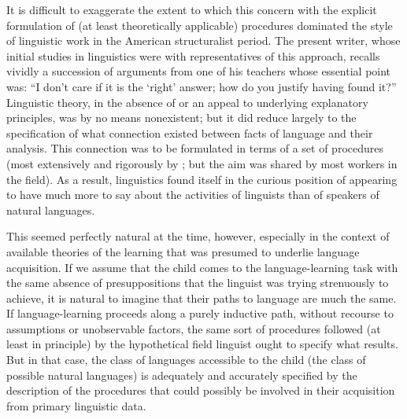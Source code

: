 It is difficult to exaggerate the extent to which this concern with
the explicit formulation of (at least theoretically applicable)
procedures dominated the style of linguistic work in the American
structuralist period. The present writer, whose initial studies in
linguistics were with representatives of this approach, recalls
vividly a succession of arguments from one of his teachers whose essential point was: ``I don't
care if it is the `right' answer; how do you justify having found it?''
Linguistic theory, in the absence of  or an appeal to
underlying explanatory principles, was by no means nonexistent; but it
did reduce largely to the specification of what connection existed
between facts of language and their analysis. This connection was to
be formulated in terms of a set of procedures (most extensively and
rigorously by \citet{harris:methods}; but the aim was shared by most
workers in the field). As a result, linguistics found itself in the
curious position of appearing to have much more to say about the
activities of linguists than of speakers of natural languages.

This seemed perfectly natural at the time, however, especially in the
context of available theories of the learning that was presumed to
underlie language acquisition. If we assume that the child comes to
the language-learning task with the same absence of presuppositions
that the linguist was trying strenuously to achieve, it is natural to
imagine that their paths to language are much the same. If
language-learning proceeds along a purely inductive path, without
recourse to assumptions or unobservable factors, the same sort of
procedures followed (at least in principle) by the hypothetical field
linguist ought to specify what results. But in that case, the class of
languages accessible to the child (the class of possible natural
languages) is adequately and accurately specified by the description
of the procedures that could possibly be involved in their acquisition
from primary linguistic data.


